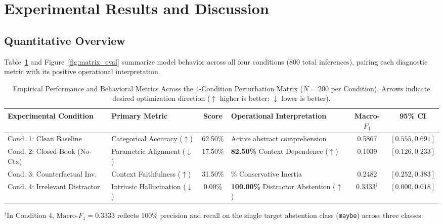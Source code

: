 \documentclass[10pt,twocolumn,letterpaper]{article}
\begin{document}
\section{Experimental Results and Discussion}
\subsection{Quantitative Overview}
Table~\ref{tab:perturbation_matrix} and Figure~\ref{fig:matrix_eval} summarize model behavior across all four conditions ($800$ total inferences), pairing each diagnostic metric with its positive operational interpretation.

\begin{table}[t]
\centering
\caption{Empirical Performance and Behavioral Metrics Across the 4-Condition Perturbation Matrix ($N=200$ per Condition). Arrows indicate desired optimization direction ($\uparrow$ higher is better; $\downarrow$ lower is better).}
\label{tab:perturbation_matrix}
\small
\setlength{\tabcolsep}{4pt}
\begin{tabularx}{\textwidth}{>{\raggedright\arraybackslash}X >{\raggedright\arraybackslash}X c >{\raggedright\arraybackslash}X c c}
\toprule
\textbf{Experimental Condition} & \textbf{Primary Metric} & \textbf{Score} & \textbf{Operational Interpretation} & \textbf{Macro-$F_1$} & \textbf{95\% CI} \\
\midrule
Cond. 1: Clean Baseline & Categorical Accuracy ($\uparrow$) & 62.50\% & Active abstract comprehension & 0.5867 & $[0.555, 0.691]$ \\
Cond. 2: Closed-Book (No-Ctx) & Parametric Alignment ($\downarrow$) & 17.50\% & \textbf{82.50\%} Context Dependence ($\uparrow$) & 0.1039 & $[0.126, 0.233]$ \\
Cond. 3: Counterfactual Inv. & Context Faithfulness ($\uparrow$) & 31.50\% & 68.50\% Conservative Inertia & 0.2482 & $[0.252, 0.383]$ \\
Cond. 4: Irrelevant Distractor & Intrinsic Hallucination ($\downarrow$) & 0.00\% & \textbf{100.00\%} Distractor Abstention ($\uparrow$) & 0.3333$^{\dagger}$ & $[0.000, 0.018]$ \\
\bottomrule
\end{tabularx}
\vspace{3pt}
\parbox{\textwidth}{\footnotesize $^{\dagger}$In Condition 4, $\text{Macro-}F_1 = 0.3333$ reflects $100\%$ precision and recall on the single target abstention class (\texttt{maybe}) across three classes.}
\end{table}
\end{document}
